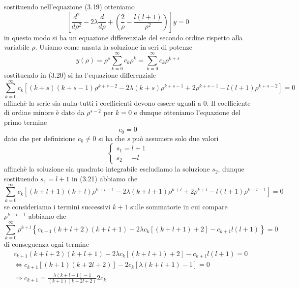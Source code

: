 sostituendo nell'equazione (3.19) otteniamo 
\begin{equation}
	\left [ \frac{d^2}{d\rho^2} - 2 \lambda \frac{d}{d\rho} + \left( \frac{2}{\rho} - \frac{l(l+1)}{\rho^2}\right) \right ]y = 0
\end{equation}
in questo modo si ha un equazione differenziale del secondo ordine rispetto alla variabile $\rho$. Usiamo come ansatz la soluzione in seri di potenze 
\begin{equation*}
	y(\rho) = \rho^s \sum_{k=0}^{\infty}c_k \rho^{k} = \sum_{k=0}^{\infty} c_k \rho^{k+s}
\end{equation*}
sostituendo in (3.20) si ha l'equazione differenziale
\begin{equation}
	\sum_{k=0}^{\infty}c_k \left [ (k+s)(k+s-1)\rho^{k+s-2} -2\lambda (k+s)\rho^{k+s-1} + 2\rho^{k+s-1} -  l(l+1)\rho^{k+s -2}\right ] = 0 
\end{equation}
affinch\`e la serie sia nulla tutti i coefficienti devono essere uguali a 0. Il coefficiente di ordine minore \`e dato da $\rho^{s-2}$ per $k=0$ e dunque otteniamo l'equazione del primo termine
\begin{equation*}
	[-l(l+1) + s(s-1)]c_0 = 0 
\end{equation*}
dato che per definizione $c_0 \neq 0$ si ha che \textit{s} pu\`o assumere solo due valori
\begin{equation*}
	\left \{ \begin{array}{l}
		s_1 = l+1 \\
		s_2 = -l
	\end{array}\right.
\end{equation*}
affinch\`e la soluzione sia quadrato integrabile escludiamo la soluzione $s_2$, dunque sostituendo $s_1 = l+1$ in (3.21) abbiamo che
\begin{equation*}
		\sum_{k=0}^{\infty}c_k \left [ (k+l+1)(k+l)\rho^{k+l-1} -2\lambda (k+l+1)\rho^{k+l} + 2\rho^{k+l} -  l(l+1)\rho^{k+l -1}\right ] = 0 
\end{equation*}
se consideriamo i termini successivi $k+1$ sulle sommatorie in cui compare $\rho^{k+l-1}$ abbiamo che
\begin{equation*}
	\sum_{k=0}^{\infty}\rho^{k+l} \left \{  c_{k+1}(k+l+2)(k+l+1) -2\lambda c_k \left [(k+l+1)+2 \right]-c_{k+1}l(l+1)\right \} = 0
\end{equation*}
di conseguenza ogni termine 
\begin{align*}
	 & c_{k+1}(k+l+2)(k+l+1) -2\lambda c_{k} \left [(k+l+1)+2 \right]-c_{k+1}l(l+1) = 0 \\[0.4cm]
	 & \iff c_{k+1}[(k+1)(k+2l+2)] - 2c_{k}[\lambda(k+l+1)-1] = 0 \\[0.4cm]
	 & \Rightarrow c_{k+1} = \frac{\lambda(k+l+1)-1}{(k+1)(k+2l+2)}2c_{k} 
\end{align*}

